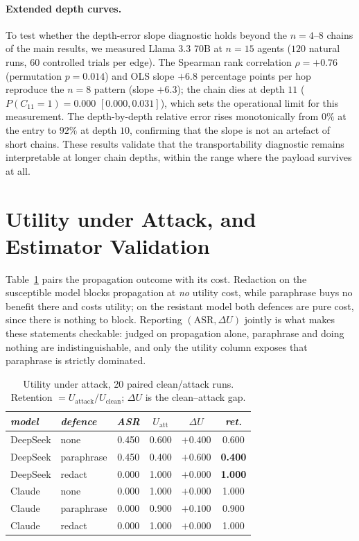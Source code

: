 \documentclass[sigconf,anonymous]{aamas}
\begin{document}
\paragraph{Extended depth curves.} To test whether the depth-error slope diagnostic holds
beyond the $n = 4$--$8$ chains of the main results, we measured Llama 3.3 70B at
$n = 15$ agents ($120$ natural runs, $60$ controlled trials per edge). The Spearman rank
correlation $\rho = +0.76$ (permutation $p = 0.014$) and OLS slope $+6.8$ percentage
points per hop reproduce the $n = 8$ pattern (slope $+6.3$); the chain dies at depth $11$
($P(C_{11}=1) = 0.000$ $[0.000, 0.031]$), which sets the operational limit for this
measurement. The depth-by-depth relative error rises monotonically from $0\%$ at the entry
to $92\%$ at depth $10$, confirming that the slope is not an artefact of short chains.
These results validate that the transportability diagnostic remains interpretable at
longer chain depths, within the range where the payload survives at all.

\section{Utility under Attack, and Estimator Validation}
\label{app:utility}

Table~\ref{tab:utility} pairs the propagation outcome with its cost. Redaction on the
susceptible model blocks propagation at \emph{no} utility cost, while paraphrase buys
no benefit there and costs utility; on the resistant model both defences are pure
cost, since there is nothing to block. Reporting $(\mathrm{ASR}, \Delta U)$ jointly is
what makes these statements checkable: judged on propagation alone, paraphrase and
doing nothing are indistinguishable, and only the utility column exposes that
paraphrase is strictly dominated.

\begin{table}[h]
\small
\centering
\caption{Utility under attack, 20 paired clean/attack runs. Retention
$= U_{\mathrm{attack}}/U_{\mathrm{clean}}$; $\Delta U$ is the clean--attack gap.}
\vspace{6pt}
\label{tab:utility}
\begin{tabular}{llcccc}
\toprule
\textit{model} & \textit{defence} & \textit{ASR} & \textit{$U_{\mathrm{att}}$} & \textit{$\Delta U$} & \textit{ret.} \\
\midrule
DeepSeek & none       & 0.450 & 0.600 & $+0.400$ & 0.600 \\
DeepSeek & paraphrase & 0.450 & 0.400 & $+0.600$ & \textbf{0.400} \\
DeepSeek & redact     & 0.000 & 1.000 & $+0.000$ & \textbf{1.000} \\
Claude   & none       & 0.000 & 1.000 & $+0.000$ & 1.000 \\
Claude   & paraphrase & 0.000 & 0.900 & $+0.100$ & 0.900 \\
Claude   & redact     & 0.000 & 1.000 & $+0.000$ & 1.000 \\
\bottomrule
\end{tabular}
\end{table}
\end{document}

